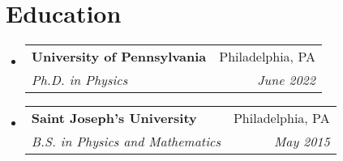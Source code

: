 \documentclass[letterpaper,11pt]{article}
\makeatletter
\newcommand{\resumeSubheading}[4]{
  \vspace{-1pt}\item
    \begin{tabular*}{0.97\textwidth}{l@{\extracolsep{\fill}}r}
      \textbf{#1} & #2 \\
      \textit{\small#3} & \textit{\small #4} \\
    \end{tabular*}\vspace{-5pt}
}
\newcommand{\resumeSubHeadingListStart}{\begin{itemize}[leftmargin=*]}
\newcommand{\resumeSubHeadingListEnd}{\end{itemize}}
\makeatother
\begin{document}
\section{Education}
  \resumeSubHeadingListStart
    \resumeSubheading
      {University of Pennsylvania}{Philadelphia, PA}
      {Ph.D. in Physics}{June 2022}
    \resumeSubheading
      {Saint Joseph's University}{Philadelphia, PA}
      {B.S. in Physics and Mathematics}{May 2015}
  \resumeSubHeadingListEnd

\end{document}
